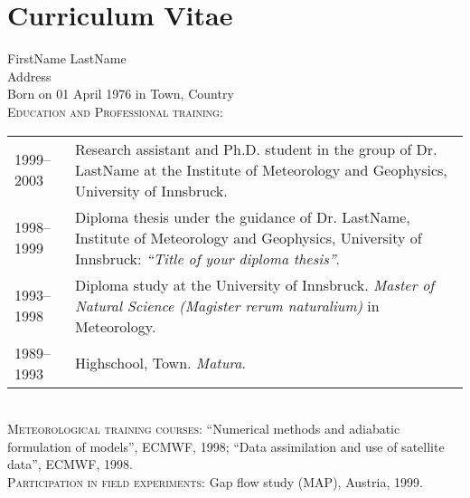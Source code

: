 \chapter*{Curriculum Vitae}
\thispagestyle{plain}
%
%
\vspace{-0.5cm}
FirstName LastName\\
Address\\
Born on 01 April 1976 in Town, Country
\\[5mm]
%
%
\textsc{Education and Professional training}:
\\[1ex]
\begin{tabular}{@{} p{2.5cm} @{} p{12.5cm} @{}}
1999--2003 &
Research assistant and Ph.D. student in the group of Dr. LastName at the
Institute of Meteorology and Geophysics, University of Innsbruck. \\[1ex]
1998--1999 &
Diploma thesis under the guidance of Dr. LastName,
Institute of Meteorology and Geophysics, University of Innsbruck:
\textit{``Title of your diploma thesis''}. \\[1ex]
1993--1998 &
Diploma study at the University of Innsbruck.
\textit{Master of Natural Science (Magister rerum naturalium)} in Meteorology.
\\[1ex]
1989--1993 &
Highschool, Town. \textit{Matura}.
\end{tabular}
\\[5mm]
%
%
\textsc{Meteorological training courses}:
``Numerical methods and adiabatic formulation of models'', ECMWF, 1998; ``Data
assimilation and use of satellite data'', ECMWF, 1998.
\\[5mm]
%
%
\textsc{Participation in field experiments}:
Gap flow study (MAP), Austria, 1999.

